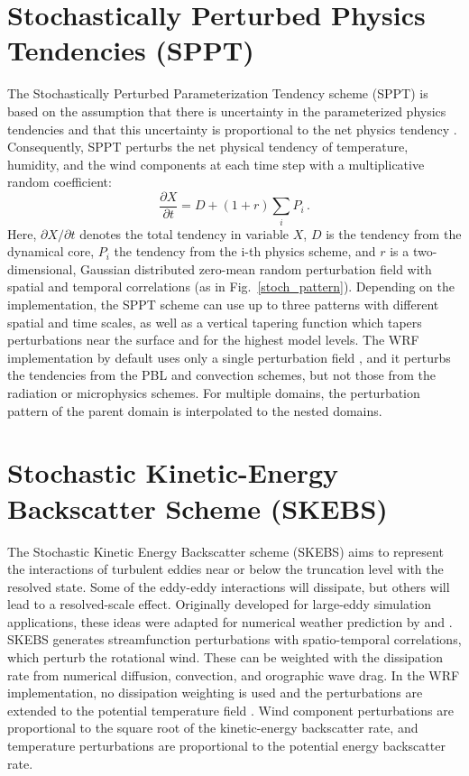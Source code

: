 \section {Stochastically Perturbed Physics Tendencies (SPPT)}
The Stochastically Perturbed Parameterization Tendency scheme
(SPPT) is based on the assumption that there is uncertainty
in the parameterized physics tendencies and that this 
uncertainty is proportional to the net physics tendency \citep{Bu99,Pa09}.
Consequently, SPPT perturbs the net physical tendency of temperature, 
humidity, and the wind components at each time step with a multiplicative 
random coefficient:
\begin{equation}
   \frac{\partial X}{\partial t}= D + (1+ r) \sum_i P_i \,.
\end{equation}
Here, ${\partial X}/{\partial t}$ denotes the total tendency in variable $X$, 
$D$ is the tendency from the dynamical core, 
$P_i$ the tendency from the i-th physics scheme, 
and $r$ is a two-dimensional, Gaussian distributed zero-mean random
perturbation field with spatial and temporal correlations (as in Fig.\, \ref{stoch_pattern}).
Depending on
the implementation, the SPPT scheme can use up to three patterns with
different spatial and time scales, as well as a vertical tapering function which 
tapers perturbations near the surface and for the highest model levels.
The WRF implementation by default uses only a single perturbation field \citep{Be15},
and it perturbs the tendencies from the PBL and convection schemes, but not those from 
the radiation or microphysics schemes. For multiple domains, the perturbation pattern of the 
parent domain is interpolated to the nested domains.

\section{Stochastic Kinetic-Energy Backscatter Scheme (SKEBS)}
The Stochastic Kinetic Energy Backscatter scheme (SKEBS) aims to represent
the interactions of turbulent eddies near or below the
truncation level with the resolved state. Some of the eddy-eddy interactions
will dissipate, but others will lead to a resolved-scale effect.
Originally developed for large-eddy simulation applications, these ideas were 
adapted for numerical weather prediction by
\citet{Sh05} and \citet{Be09}.
SKEBS generates streamfunction perturbations with spatio-temporal
correlations, which perturb the rotational wind. These can be weighted
with the dissipation rate from numerical diffusion, convection, and
orographic wave drag.
In the WRF implementation, no dissipation weighting is used and the 
perturbations are extended to the potential temperature field \citep{Be11}.
Wind component perturbations are proportional to the square
root of the kinetic-energy backscatter rate, and temperature
perturbations are proportional to the potential energy backscatter rate.


